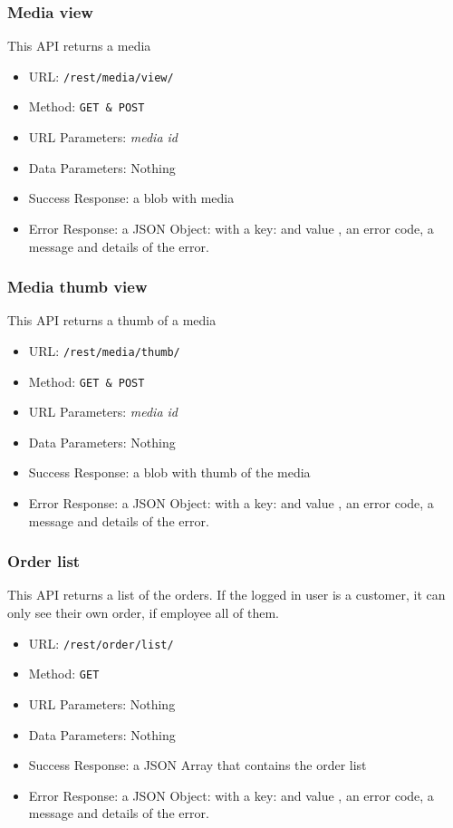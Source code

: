 \subsubsection*{Media view}

This API returns a media

\begin{itemize}
    \item URL: \texttt{/rest/media/view/}
    \item Method: \texttt{GET \& POST}
    \item URL Parameters: \textit{media id}
    \item Data Parameters: Nothing
    \item Success Response: a blob with media
    \item Error Response: a JSON Object: with a key:   and value , an error code, a message and details of the error.
\end{itemize}

\subsubsection*{Media thumb view}

This API returns a thumb of a media

\begin{itemize}
    \item URL: \texttt{/rest/media/thumb/}
    \item Method: \texttt{GET \& POST}
    \item URL Parameters: \textit{media id}
    \item Data Parameters: Nothing
    \item Success Response: a blob with thumb of the media
    \item Error Response: a JSON Object: with a key:   and value , an error code, a message and details of the error.
\end{itemize}


\subsubsection*{Order list}

This API returns a list of the orders.
If the logged in user is a customer, it can only see their own order, if employee all of them.

\begin{itemize}
    \item URL: \texttt{/rest/order/list/}
    \item Method: \texttt{GET}
    \item URL Parameters: Nothing
    \item Data Parameters: Nothing
    \item Success Response: a JSON Array that contains the order list
    \item Error Response: a JSON Object: with a key:   and value , an error code, a message and details of the error.
\end{itemize}


